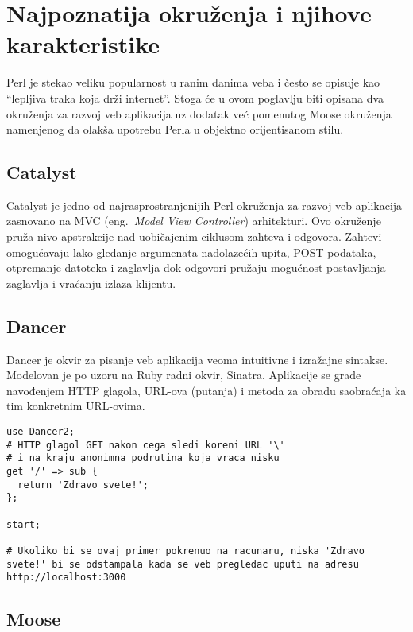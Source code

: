 \documentclass[a4paper]{article}
\begin{document}
\section{Najpoznatija okruženja i njihove karakteristike}

Perl je stekao veliku popularnost u ranim danima veba i često se opisuje kao ``lepljiva traka koja drži internet''. Stoga će u ovom poglavlju biti opisana dva okruženja za razvoj veb aplikacija uz dodatak već pomenutog Moose okruženja namenjenog da olakša upotrebu Perla u objektno orijentisanom stilu. 

\subsection{Catalyst}

Catalyst je jedno od najrasprostranjenijih Perl okruženja za razvoj veb aplikacija zasnovano na MVC (eng.~{\em Model View Controller}) arhitekturi. Ovo okruženje pruža nivo apstrakcije nad uobičajenim ciklusom zahteva i odgovora. Zahtevi omogućavaju lako gledanje argumenata nadolazećih upita, POST podataka, otpremanje datoteka i zaglavlja dok odgovori pružaju mogućnost postavljanja zaglavlja i vraćanju izlaza klijentu. 

\subsection{Dancer}

Dancer je okvir za pisanje veb aplikacija veoma intuitivne i izražajne sintakse. Modelovan je po uzoru na Ruby radni okvir, Sinatra. Aplikacije se grade navođenjem HTTP glagola, URL-ova (putanja) i metoda za obradu saobraćaja ka tim konkretnim URL-ovima. 

\begin{lstlisting}[caption={Osnovna sintaksa Dancer okruženja}, frame=single, label = dancer]
use Dancer2;
# HTTP glagol GET nakon cega sledi koreni URL '\'
# i na kraju anonimna podrutina koja vraca nisku
get '/' => sub { 
  return 'Zdravo svete!';
};
 
start;

# Ukoliko bi se ovaj primer pokrenuo na racunaru, niska 'Zdravo svete!' bi se odstampala kada se veb pregledac uputi na adresu http://localhost:3000 

\end{lstlisting}

\subsection{Moose}
\end{document}
